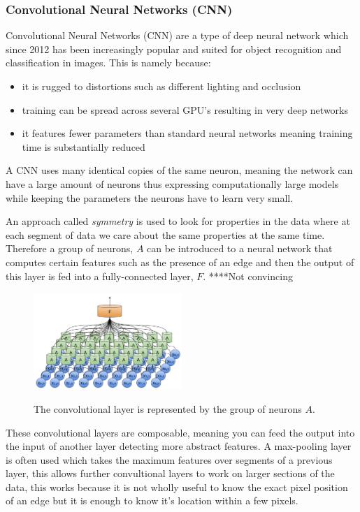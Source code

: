 \documentclass{mproj}
\begin{document}
\subsubsection{Convolutional Neural Networks (CNN)}
  
Convolutional Neural Networks (CNN) are a type of deep neural network which since 2012\cite{} has been  increasingly popular and suited for object recognition and classification in images. This is namely because:

\begin{itemize}
\item it is rugged to distortions such as different lighting and  occlusion
\item training can be spread across several GPU's resulting in very deep networks
\item it features fewer parameters than standard neural networks meaning training time is substantially reduced
\end{itemize}

A CNN uses many identical copies of the same neuron, meaning the network can have a large amount of neurons thus expressing computationally large models while keeping the parameters the neurons have to learn very small. \cite{NIPS2012_4824}
  
An approach called \textit{symmetry} is used to look for properties in the data where at each segment of data we care about the same properties at the same time. Therefore a group of neurons, $A$ can be introduced to a neural network that computes certain features such as the presence of an edge and then the output of this layer is fed into a fully-connected layer, $F$. ****Not convincing
  
\begin{figure}[h]
  \caption{The convolutional layer is represented by the group of neurons $A$.}
  \centering
  \includegraphics[width=0.5\textwidth]{images/conv.png}
  \label{fig:Basic CNN diagram}
\end{figure}

These convolutional layers are composable, meaning you can feed the output into the input of another layer detecting more abstract features. A max-pooling layer is often used which takes the maximum features over segments of a previous layer, this allows further convultional layers to work on larger sections of the data, this works because it is not wholly useful to know the exact pixel position of an edge but it is enough to know it's location within a few pixels.
 
\end{document}
